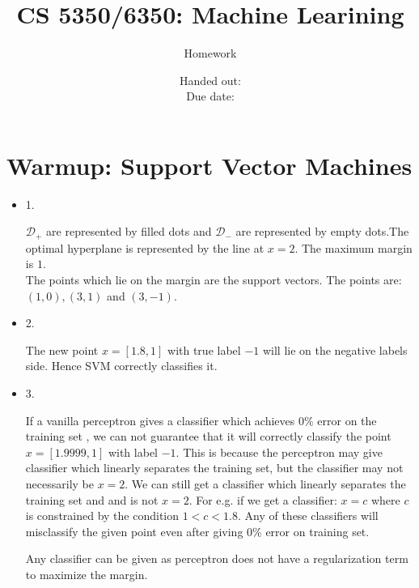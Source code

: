 \documentclass[12pt]{exam}
\title{CS 5350/6350: Machine Learining \semester}
\author{Homework \assignmentId}
\date{Handed out: \releaseDate\\
  Due date: \dueDate}
\begin{document}
\maketitle
\printanswers
\section{Warmup: Support Vector Machines}
\begin{itemize}
\item[] 1.
\begin{solution}
$\mathcal{D}_+$ are represented by filled dots and $\mathcal{D}_-$ are represented by empty dots.The optimal hyperplane is represented by the line at $x= 2$. The maximum margin is $1$.\\
The points which lie on the margin are the support vectors. The points are: 
$(1,0) ,(3,1)$ and $(3,-1)$.

\end{solution}

\item[] 2.
\begin{solution}
The new point $x = [1.8, 1]$ with true label $-1$ will lie on the negative labels side. Hence SVM correctly classifies it.
\end{solution}

\item[] 3.
\begin{solution}
If a vanilla perceptron gives a classifier which achieves $0\%$ error on the training set , we can not guarantee that it will correctly classify the point $x = [1.9999,1]$ with label $-1$. This is because the perceptron may give classifier which linearly separates the training set, but the classifier may not necessarily be $x=2$. We can still get a classifier which linearly separates the training set and and is not $x=2$. For e.g. if we get a classifier:
$x = c$ where $c$ is constrained by the condition $1 < c < 1.8$. Any of these classifiers will misclassify the given point even after giving $0\%$ error on training set.

Any classifier can be given as perceptron does not have a regularization term to maximize the margin.
\end{solution}
\end{itemize}
\end{document}

